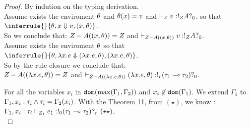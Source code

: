 \begin{proof}
  By indution on the typing derivation.\\


  Assume exists the enviroment $\theta$ and $\theta(x) =v$ and
  $\empty \tvdash{ \nnatA} \valr: \bang{\nnatA}\ltype \whynot{0} $. so that
  $\inferrule{ }{\env, x \bigstep \valr, (x, \env ) }  $. \\
  So we conclude that: $ Z- A(  (x, \theta)  ) = Z $ and
  $\empty \tvdash{ \nnatA- A(  (x, \env)  ) } \valr: \bang{\nnatA}\ltype\whynot{0}$.\\
   
  
 Assume exists the enviroment $\theta$ so that\\
  $\inferrule{ }{\env, \lambda x. \expr \bigstep (\lambda
    x.\expr,\env), (\lambda x.\expr, \env ) }  $. \\
  So by the rule closure we conclude that: \\
  $ Z- A(  (\lambda x.e,\theta)  ) = Z $ and
  $\empty \tvdash{ \nnatA- A(  (\lambda x.\expr, \env)  ) }   (\lambda
    x.\expr,\env) : \bang{r}  ( \type_1
      \lto \type_2)\whynot{0}$.\\

  


  

   For all the variables $x_i $ in $\mathtt{dom}(\max(\Gamma_1, \Gamma_2  )) $ and
   $x_i \not\in \mathtt{dom}(\Gamma_1)$. 
   We extend $\Gamma_1 $ to $\Gamma_1, x_i : \tau_i \land \tau_i =\Gamma_2(x_i) $. With the
   Theorem 11, from $(\star)$, we know :\\
   $\Gamma_1, x_i : \tau_i \vdash_{Z_1} e_1:  !_{0} ( \tau_1
   \multimap \tau_2  )?_{r}  ~(\star \star)   $.\\
   

\end{proof}
